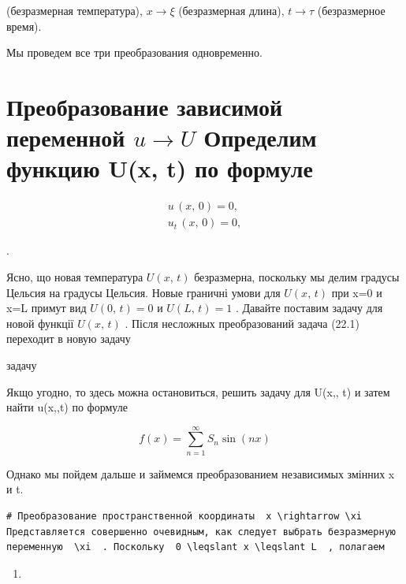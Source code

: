 \documentclass[
  ukrainian,
]{article}
\providecommand{\tightlist}{%
  \setlength{\itemsep}{0pt}\setlength{\parskip}{0pt}}
\begin{document}
(безразмерная температура), \(x \to \xi\) (безразмерная длина),
\(t \to \tau\) (безразмерное время).

Мы проведем все три преобразования одновременно.

\section{\texorpdfstring{Преобразование зависимой переменной
\(u \rightarrow U\) Определим функцию U(x, t) по
формуле}{Преобразование зависимой переменной u \textbackslash rightarrow U Определим функцию U(x, t) по формуле}}\label{ux43fux440ux435ux43eux431ux440ux430ux437ux43eux432ux430ux43dux438ux435-ux437ux430ux432ux438ux441ux438ux43cux43eux439-ux43fux435ux440ux435ux43cux435ux43dux43dux43eux439-u-rightarrow-u-ux43eux43fux440ux435ux434ux435ux43bux438ux43c-ux444ux443ux43dux43aux446ux438ux44e-ux-t-ux43fux43e-ux444ux43eux440ux43cux443ux43bux435}

\[
\begin{aligned} u \, (x, \, 0) = 0, \\ u_{t} \, (x, \, 0) = 0, \end{aligned}
\]

.

Ясно, що новая температура \(U\left(x,\,t\right)\) безразмерна,
поскольку мы делим градусы Цельсия на градусы Цельсия. Новые граничні
умови для \(U\left(x,\,t\right)\) при x=0 и x=L примут вид
\(U\left(0,\,t\right)=0\) и \(U\left(L,\,t\right)=1\) . Давайте поставим
задачу для новой функції \(U\left(x,\,t\right)\) . Після несложных
преобразований задача (22.1) переходит в новую задачу

задачу

Якщо угодно, то здесь можна остановиться, решить задачу для U\left(x,,
t\right) и затем найти u\left(x,,t\right) по формуле

\[
f(x) = \sum_{n=1}^{\infty} S_n \sin(nx)
\]

Однако мы пойдем дальше и займемся преобразованием независимых змінних x
и t.

\begin{verbatim}
# Преобразование пространственной координаты  x \rightarrow \xi  Представляется совершенно очевидным, как следует выбрать безразмерную переменную  \xi  . Поскольку  0 \leqslant x \leqslant L  , полагаем
\end{verbatim}

\begin{enumerate}
\def\labelenumi{\arabic{enumi}.}
\tightlist
\item
\end{enumerate}
\end{document}
